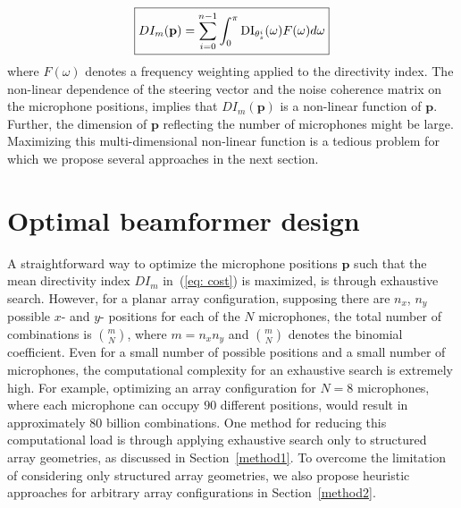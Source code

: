 \documentclass[9pt]{article}
\begin{document}
\begin{equation}
\label{eq: cost}
\boxed{DI_{m}(\mathbf{p}) = \sum_{i = 0}^{n-1} \int_{0}^{\pi} {\rm{DI}}_{\theta_{s}^{i}}(\omega) {F}(\omega) d\omega}
\end{equation}
where $F(\omega)$ denotes a frequency weighting applied to the directivity index.
The non-linear dependence of the steering vector and the noise coherence matrix on the microphone positions, implies that $DI_{m}(\mathbf{p})$ is a non-linear function of $\mathbf{p}$.
Further, the dimension of $\mathbf{p}$ reflecting the number of microphones might be large. 
Maximizing this multi-dimensional non-linear function is a tedious problem for which we propose several approaches in the next section.
\vspace{-0.2cm}
\section{Optimal beamformer design}
\label{sec: methods}
\vspace{-0.2cm}
A straightforward way to optimize the microphone positions $\mathbf{p}$ such that the mean directivity index $DI_{m}$ in~(\ref{eq: cost}) is maximized, is through exhaustive search. 
However, for a planar array configuration, supposing there are $n_{x}$, $n_{y}$ possible $x$- and $y$- positions for each of the $N$ microphones, the total number of combinations is ${m \choose N}$, where $m = n_{x}n_{y}$ and ${m \choose N}$ denotes the binomial coefficient. 
Even for a small number of possible positions and a small number of microphones, the computational complexity for an exhaustive search is extremely high. 
For example, optimizing an array configuration for $N = 8$ microphones, where each microphone can occupy $90$ different positions, would result in approximately $80$ billion combinations. 
One method for reducing this computational load is through applying exhaustive search only to structured array geometries, as discussed in Section~\ref{method1}. To overcome the limitation of considering only structured array geometries, we also propose heuristic approaches for arbitrary array configurations in Section~\ref{method2}.
\vspace{-0.3cm}
\end{document}
